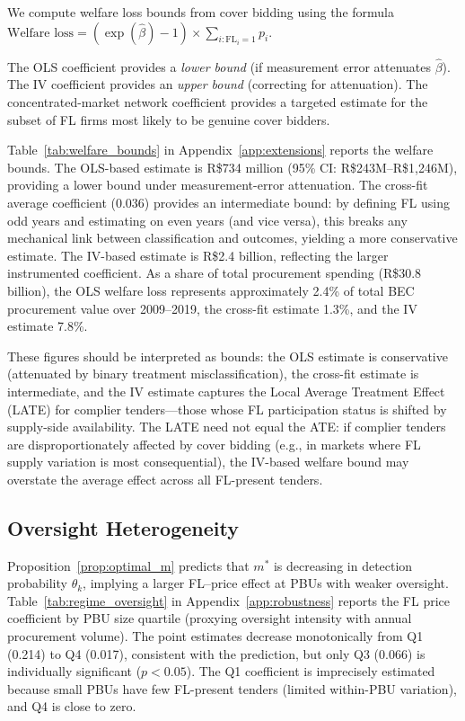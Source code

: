 We compute welfare loss bounds from cover bidding using the formula
$\text{Welfare loss} = (\exp(\hat{\beta}) - 1) \times
\sum_{i: \text{FL}_i = 1} p_i$.

The OLS coefficient provides a \emph{lower bound} (if measurement error
attenuates $\hat{\beta}$). The IV coefficient provides an
\emph{upper bound} (correcting for attenuation). The concentrated-market
network coefficient provides a targeted estimate for the subset of FL
firms most likely to be genuine cover bidders.

Table~\ref{tab:welfare_bounds} in Appendix~\ref{app:extensions} reports
the welfare bounds. The OLS-based estimate is R\$734 million (95\% CI:
R\$243M--R\$1,246M), providing a lower bound under measurement-error
attenuation. The cross-fit average coefficient (0.036) provides an
intermediate bound: by defining FL using odd years and estimating on even
years (and vice versa), this breaks any mechanical link between
classification and outcomes, yielding a more conservative estimate. The
IV-based estimate is R\$2.4 billion, reflecting the larger instrumented
coefficient. As a share of total procurement spending (R\$30.8 billion), the OLS
welfare loss represents approximately 2.4\% of total BEC procurement
value over 2009--2019, the cross-fit estimate 1.3\%, and the IV estimate
7.8\%.

These figures should be interpreted as bounds: the OLS estimate is
conservative (attenuated by binary treatment misclassification), the
cross-fit estimate is intermediate, and the IV estimate captures the
Local Average Treatment Effect (LATE) for complier tenders---those whose
FL participation status is shifted by supply-side availability. The LATE
need not equal the ATE: if complier tenders are disproportionately
affected by cover bidding (e.g., in markets where FL supply variation is
most consequential), the IV-based welfare bound may overstate the average
effect across all FL-present tenders.

\subsection{Oversight Heterogeneity} %

Proposition~\ref{prop:optimal_m} predicts that $m^*$ is decreasing in
detection probability $\theta_k$, implying a larger FL--price effect
at PBUs with weaker oversight. Table~\ref{tab:regime_oversight} in
Appendix~\ref{app:robustness} reports the FL price coefficient by PBU
size quartile (proxying oversight intensity with annual procurement
volume). The point estimates decrease monotonically from Q1 (0.214)
to Q4 (0.017), consistent with the prediction, but only Q3 (0.066)
is individually significant ($p < 0.05$). The Q1 coefficient is
imprecisely estimated because small PBUs have few FL-present tenders
(limited within-PBU variation), and Q4 is close to zero.

